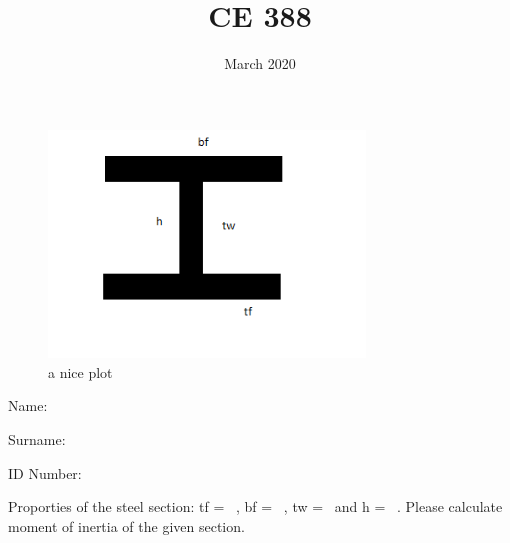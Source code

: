 \documentclass[12pt, a4paper]{article}
\title{CE 388}
\date{March 2020}
\begin{document}
\maketitle

\begin{figure}[h]
    \centering
    \includegraphics[width=0.75\textwidth]{theimage}
    \caption{a nice plot}
    \label{fig:mesh1}
\end{figure}

Name: \varZero\

Surname: \varOne\

ID Number: \varTwo\

Proporties of the steel section: tf = \varThree\ , bf = \varFour\ , tw = \varFive\ and h = \varSix\ . Please calculate moment of inertia of the given section.
\end{document}
